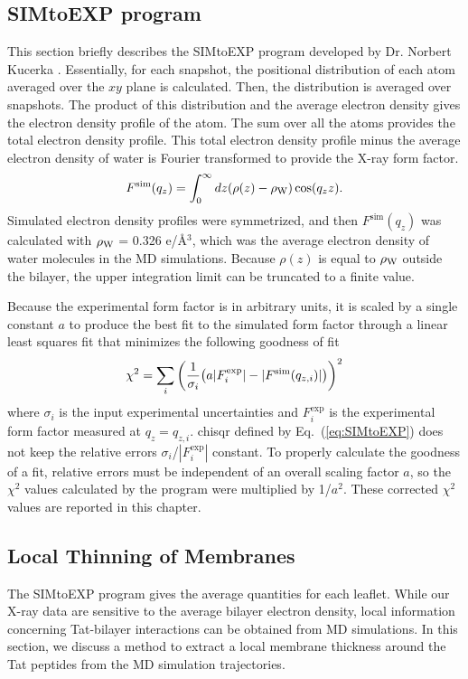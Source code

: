 \subsection{SIMtoEXP program}\label{sec:SIMtoEXP}
This section briefly describes the SIMtoEXP program
developed by Dr. Norbert Kucerka \cite{Kucerka10}.
Essentially, for each snapshot, the positional distribution of each atom
averaged over the $xy$ plane is calculated. Then, the distribution is
averaged over snapshots. The product of this distribution and the average
electron density gives the electron density profile of the atom. The sum 
over all the atoms provides the total electron density profile. This total
electron density profile minus the average electron density of water
is Fourier transformed to provide the X-ray form factor.
\begin{equation}
  F^\textrm{sim}(q_z) = \int_0^\infty\mathop{dz} (\rho(z)-\rho_\textrm{W})\cos (q_zz).
\end{equation}
Simulated electron density profiles were symmetrized, and then
$F^\textrm{sim}(q_z)$ was calculated with $\rho_\textrm{W}$ = 0.326 e/\AA$^3$,
which was the average electron density of water molecules in the MD simulations.
Because $\rho(z)$ is equal to $\rho_\textrm{W}$ outside the bilayer, the upper 
integration limit can be truncated to a finite value. 

Because the experimental form factor is in arbitrary units, it is 
scaled by a single constant $a$ to produce the best fit to the simulated
form factor through a linear least squares fit that minimizes the 
following goodness of fit
\begin{equation}
  \chi^2 = \sum_i \left(\frac{1}{\sigma_i}\mathopen{}\left( 
    a|F^\textrm{exp}_i| - |F^\textrm{sim}(q_{z,i})|
   \right)\mathclose{}\right)^2
  \label{eq:SIMtoEXP}
\end{equation}
where $\sigma_i$ is the input experimental uncertainties and $F_i^\textrm{exp}$
is the experimental form factor measured at $q_z = q_{z,i}$.
\gls{chisqr} defined by Eq.~(\ref{eq:SIMtoEXP}) does not keep the relative errors
$\sigma_i$/$|F_i^\textrm{exp}|$ constant. 
To properly calculate the goodness of a fit, relative errors must be 
independent of an overall scaling factor $a$, so
the $\chi^2$ values calculated by the program were multiplied by 1/$a^2$. 
These corrected $\chi^2$ values are reported in this chapter.

\subsection{Local Thinning of Membranes}\label{sec:local_thinning}
The SIMtoEXP program gives the average quantities for each leaflet. 
While our X-ray data are sensitive to the average bilayer electron density,
local information concerning Tat-bilayer interactions can be obtained from MD simulations.
In this section, we discuss a method to extract a local membrane thickness
around the Tat peptides from the MD simulation trajectories. 


